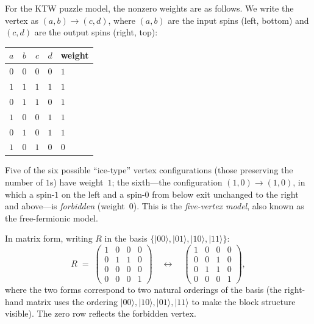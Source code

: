 For the KTW puzzle model, the nonzero weights are as follows.  We
write the vertex as $(a, b) \to (c, d)$, where $(a, b)$ are the
input spins (left, bottom) and $(c, d)$ are the output spins (right,
top):

\begin{center}
\renewcommand{\arraystretch}{1.3}
\begin{tabular}{ccccl}
\toprule
$a$ & $b$ & $c$ & $d$ & weight \\
\midrule
$0$ & $0$ & $0$ & $0$ & $1$ \\
$1$ & $1$ & $1$ & $1$ & $1$ \\
$0$ & $1$ & $1$ & $0$ & $1$ \\
$1$ & $0$ & $0$ & $1$ & $1$ \\
$0$ & $1$ & $0$ & $1$ & $1$ \\
\midrule
$1$ & $0$ & $1$ & $0$ & $0$ \\
\bottomrule
\end{tabular}
\end{center}

Five of the six possible ``ice-type'' vertex configurations (those
preserving the number of $1$s) have weight~$1$; the sixth---the
configuration $(1,0) \to (1,0)$, in which a spin-$1$ on the left
and a spin-$0$ from below exit unchanged to the right and above---is
\emph{forbidden} (weight~$0$).  This is the \emph{five-vertex model},
also known as the free-fermionic model.

In matrix form, writing $R$ in the basis $\{|00\rangle,
|01\rangle, |10\rangle, |11\rangle\}$:
\begin{equation}
\label{eq:rmatrix-puzzle}
  R \;=\;
  \begin{pmatrix}
    1 & 0 & 0 & 0 \\
    0 & 1 & 1 & 0 \\
    0 & 0 & 0 & 0 \\
    0 & 0 & 0 & 1
  \end{pmatrix}
  \quad\longleftrightarrow\quad
  \begin{pmatrix}
    1 & 0 & 0 & 0 \\
    0 & 0 & 1 & 0 \\
    0 & 1 & 1 & 0 \\
    0 & 0 & 0 & 1
  \end{pmatrix},
\end{equation}
where the two forms correspond to two natural orderings of the basis
(the right-hand matrix uses the ordering
$|00\rangle, |10\rangle, |01\rangle, |11\rangle$ to make the
block structure visible).  The zero row reflects the forbidden vertex.

